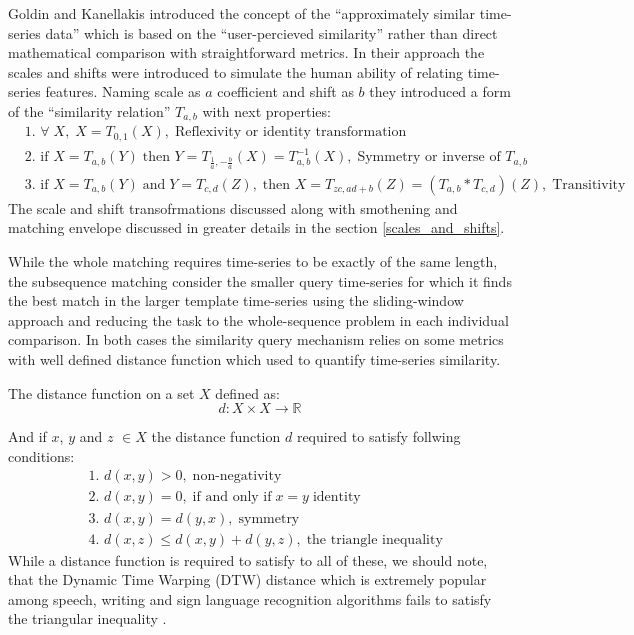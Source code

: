 Goldin and Kanellakis \cite{citeulike:3815880} introduced the concept of the ``approximately similar time-series data'' which is based on the ``user-percieved similarity'' rather than direct mathematical comparison with straightforward metrics. In their approach the scales and shifts were introduced to simulate the human ability of relating time-series features. Naming scale as $a$ coefficient and shift as $b$ they introduced a form of the  ``similarity relation'' $T_{a,b}$ with next properties:
\begin{align}
 & \text{1. } \forall \; X, \; X=T_{0,1}(X), \; \text{Reflexivity or identity transformation} \\
 & \text{2. } \text{if } X=T_{a,b}(Y) \; \text{then } Y=T_{\frac{1}{a},-\frac{b}{a}}(X) = T^{-1}_{a,b}(X), \; \text{Symmetry or inverse of $T_{a,b}$} \\
 & \text{3. } \text{if } X=T_{a,b}(Y) \; \text{and} \; Y=T_{c,d}(Z), \; \text{then } X=T_{zc, ad+b}(Z) = (T_{a,b} * T_{c,d})(Z), \; \text{Transitivity}
\end{align}
The scale and shift transofrmations discussed along with smothening and matching envelope discussed in greater details in the section \ref{scales_and_shifts}.

While the whole matching requires time-series to be exactly of the same length, the subsequence matching consider the smaller query time-series for which it finds the best match in the larger template time-series using the sliding-window approach and reducing the task to the whole-sequence problem in each individual comparison. In both cases the similarity query mechanism relies on some metrics with well defined distance function which used to quantify time-series similarity. 

The distance function on a set $X$ defined as:
\begin{equation}
 d: X \times X \rightarrow \mathbb{R}
\end{equation}

And if $x$, $y$ and $z$ $\in X$ the distance function $d$ required to satisfy follwing conditions:
\begin{align}
 & \text{1. } d(x, y) > 0, \; \text{non-negativity} \\
 & \text{2. } d(x, y) = 0, \; \text{if and only if} \; x = y  \;  \text{identity} \\
 & \text{3. } d(x, y) = d(y, x), \; \text{symmetry} \\
 & \text{4. } d(x, z) \leq d(x, y) + d(y, z), \; \text{the triangle inequality}
\end{align}
While a distance function is required to satisfy to all of these, we should note, that the Dynamic Time Warping (DTW) distance which is extremely popular among speech, writing and sign language recognition algorithms \cite{citeulike:3496861} \cite{citeulike:3744226} \cite{citeulike:3733947} \cite{citeulike:3789964} fails to satisfy the triangular inequality \cite{citeulike:4343286} \cite{citeulike:4343933}.

